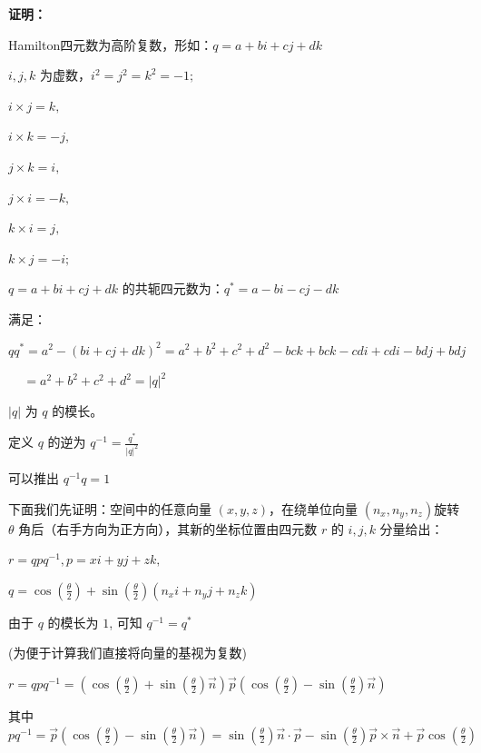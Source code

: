 \documentclass[withoutpreface,bwprint]{cumcmthesis} %
\begin{document}
\noindent\textbf{证明：}

Hamilton四元数为高阶复数，形如：$q=a+bi+cj+dk$ \par
$i,j,k$ 为虚数，$i^2=j^2=k^2=-1;$ \par
$i \times j=k,$ \par
$i \times k=-j,$ \par
$j \times k=i,$ \par
$j \times i=-k,$ \par
$k \times i=j,$ \par
$k \times j=-i;$ \par
$q=a+bi+cj+dk$ 的共轭四元数为：$q^*=a-bi-cj-dk$ \par
满足：\par
$qq^*=a^2-(bi+cj+dk)^2=a^2+b^2+c^2+d^2-bck+bck-cdi+cdi-bdj+bdj$ \par
\quad\ \ \,$=a^2+b^2+c^2+d^2=|q|^2$ \par
$|q|$ 为 $q$ 的模长。\par
定义 $q$ 的逆为 $q^{-1}=\frac{\displaystyle q^*}{\displaystyle |q|^2}$ \par
可以推出 $q^{-1}q=1$ \par
下面我们先证明：空间中的任意向量 $( x ,y ,z )$，在绕单位向量 $(n_x,n_y,n_z)$旋转 $\theta $
角后（右手方向为正方向），其新的坐标位置由四元数 $r$ 的 $i , j , k$ 分量给出：\par
$r=qpq^{-1},p=xi+yj+zk,$ \par
$q = \cos(\frac{\theta }{2}) + \sin(\frac{\theta }{2})(n_xi + 
    n_yj + n_zk)$ \par
由于 $q$ 的模长为 $1$, 可知 $q^{-1}=q^*$ \par
(为便于计算我们直接将向量的基视为复数) \par
$r = qpq^{-1} = (\cos(\frac{\theta}{2}) + 
\sin(\frac{\theta}{2})\overrightarrow{n})\overrightarrow{p} 
(\cos(\frac{\theta}{2}) - \sin(\frac{\theta}{2})
\overrightarrow{n})$ \par
其中 $pq^{-1} = \overrightarrow{p} (\cos(\frac{\theta}{2}) - 
\sin(\frac{\theta}{2})\overrightarrow{n}) = 
\sin(\frac{\theta}{2})\overrightarrow{n} \cdot \overrightarrow{p} -
\sin(\frac{\theta}{2})\overrightarrow{p} \times \overrightarrow{n} +
\overrightarrow{p} \cos(\frac{\theta}{2})$
\end{document}
